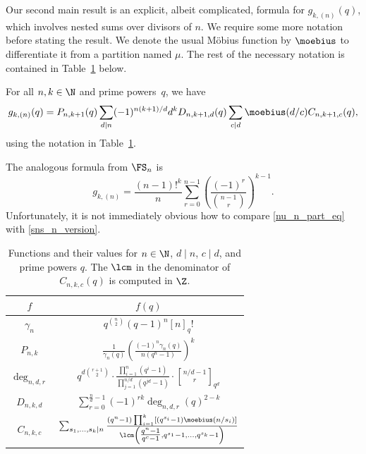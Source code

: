 Our second main result is an explicit, albeit complicated, formula for \(g_{k,(n)} (q)\), which involves nested sums over divisors of \(n\).
We require some more notation before stating the result.
We denote the usual M\"obius function by \(\moebius\) to differentiate it from a partition named \(\mu\).
The rest of the necessary notation is contained in Table~\ref{formula_table} below.




\begin{theorem}
\label{nu_n_part}
For all \(n, k \in \N\) and prime powers~\(q\),
we have
\begin{equation}
\label{nu_n_part_eq}
g_{k,(n)}(q) = P_{n,k+1} (q)
\sum_{d \mid n}
(-1)^{n(k+1)/d}
d^{k}
D_{n,k+1,d} (q)
\sum_{c \mid d}
\moebius(d/c)
C_{n,k+1,c} (q),
\end{equation}
using the notation in Table~\ref{formula_table}.
\end{theorem}


The analogous formula from \(\FS_n\) is
\begin{equation}
\label{sns_n_version}
g_{k,(n)}
=
\frac{(n-1)!^{k}}{n}
\sum_{r=0}^{n-1}
\left (
\frac{(-1)^r}{\binom{n-1}{r}}
\right )^{k-1}.
\end{equation}
Unfortunately, it is not immediately obvious how to compare \eqref{nu_n_part_eq} with \eqref{sns_n_version}.








\begin{table}[ht]
\caption{Functions and their values for \(n \in \N\), \(d \mid n\), \(c \mid d\), and prime powers \(q\). The \(\lcm\) in the denominator of \(C_{n,k,c}(q)\) is computed in \(\Z\).}
\centering
\renewcommand{\arraystretch}{2}
\begin{tabular}{|c|c|}
\hline
\(f\) & \(f(q)\) \\
\hline
\(
\gamma_{n}\) & \(q^{\binom{n}{2}} (q-1)^n [n]_q!
\) \\
\(
P_{n,k}\) & \(
\frac{1}{\gamma_{n}(q)}
\left ( \frac{(-1)^n \gamma_n (q)}{n (q^n-1)} \right )^k
\) \\
\(
\deg_{n,d,r}\) & \(
q^{d \binom{r+1}{2}}
\cdot
\frac{\prod_{i=1}^n (q^i - 1)}{\prod_{j=1}^{n/d} (q^{jd} - 1)}
\cdot
{\genfrac[]{0pt}{1}{n/d - 1}{r}}_{q^d}
\) \\
\(
D_{n,k,d} \) & \(
\sum_{r = 0}^{\tfrac{n}{d} - 1}
(-1)^{rk} \deg_{n,d,r}(q)^{2-k}
\) \\
\(
C_{n,k,c}\) & \(
\sum_{s_1,\ldots,s_k \mid n}
\frac{(q^n-1)\prod_{i=1}^k \left [ (q^{s_i}-1) \moebius( n / s_i ) \right ]}{\lcm \left (
\tfrac{q^n-1}{q^c-1},
q^{s_1}-1,
\ldots,
q^{s_k}-1
\right ) }
\) \\
\hline
\end{tabular}
\label{formula_table}
\end{table}







